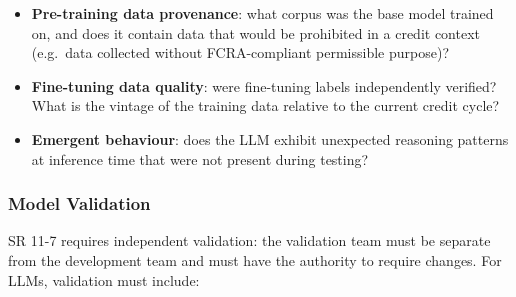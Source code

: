 \begin{context}
\begin{itemize}
  \item \textbf{Pre-training data provenance}: what corpus was the base model trained on, and does it contain data that would be prohibited in a credit context (e.g.\ data collected without FCRA-compliant permissible purpose)?
  \item \textbf{Fine-tuning data quality}: were fine-tuning labels independently verified? What is the vintage of the training data relative to the current credit cycle?
  \item \textbf{Emergent behaviour}: does the LLM exhibit unexpected reasoning patterns at inference time that were not present during testing?
\end{itemize}

\subsubsection*{Model Validation}

SR 11-7 requires independent validation: the validation team must be separate from the development team and must have the authority to require changes. For LLMs, validation must include:


\end{context}
